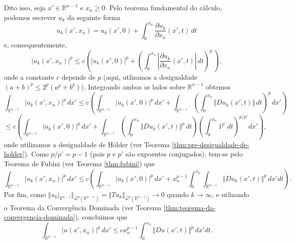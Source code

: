 \documentclass[a4paper, 11pt]{book}
\theoremstyle{definition}
\newcommand{\bR}{\mathbb{R}}
\newcommand{\cL}{\mathcal{L}}
\begin{document}
\begin{prf}
    Dito isso, seja $x' \in \bR^{n-1}$ e $x_n \geqslant 0$.
    Pelo teorema fundamental do cálculo, podemos escrever $u_k$ da seguinte forma
    \[
        u_k(x'\!,x_n) = u_k(x'\!,0) + \int_0^{x_n} \dfrac{\partial u_k}{\partial x_n} (x'\!,t) \,dt
    \]
    e, consequentemente,
    \[
        |u_k(x'\!,x_n)|^p \leqslant c \left(  |u_k(x'\!,0)|^p + \left(  \int_0^{x_n} \left|\dfrac{\partial u_k}{\partial x_n} (x'\!,t)\right| \,dt\right)^{\!p\,} \right),
    \]
    onde a constante $c$ depende de $p$ (aqui, utlizamos a desigualdade $(a + b)^p \leqslant 2^p (a^p + b^p)$). Integrando ambos os lados sobre $\bR^{n-1}$ obtemos
    \[
        \int_{\bR^{n-1}} |u_k(x',x_n)|^p \,dx' \leqslant c \left( \int_{\bR^{n-1}} |u_k(x',0)|^p \,dx' + \int_{\bR^{n-1}} \left(  \int_0^{x_n} \Vert Du_k(x',t) \Vert \,dt\right)^{\!p\,} dx' \right)
    \]
    \[
        \leqslant  c \left( \int_{\bR^{n-1}} |u_k(x',0)|^p \,dx' + \int_{\bR^{n-1}} \left( \int_0^{x_n} \Vert Du_k (x',t) \Vert^p \,dt \right)\left( \int_0^{x_n} 1^{p'} \,dt \right)^{p/p'} dx'\right),
    \]
    onde utilizamos a desigualdade de Hölder (ver Teorema \ref{thm:pre-desigualdade-de-holder}).
    Como $p/p' = p-1$ (pois $p$ e $p'$ são expoentes conjugados), tem-se pelo Teorema de Fubini (ver Teorema \ref{thm:fubini}) que
    \[
        \int_{\bR^{n-1}} |u_k(x',x_n)|^p \,dx' \leqslant c \left( \int_{\bR^{n-1}} |u_k(x',0)|^p \,dx' + x_n^{p-1} \int_{0}^{x_n} \int_{\bR^{n-1}} \Vert Du_k (x',t) \Vert^p  \,dx'dt \right).
    \]
    Por fim, como $\Vert u_k |_{\bR^{n-1}} \Vert_{\cL^p(\bR^{n-1})} = \Vert Tu_k \Vert_{\cL^p(\bR^{n-1})} \to 0$ quando $k \to \infty$, e utlizando o Teorema da Convergência Dominada (ver Teorema \ref{thm:teorema-da-convergencia-dominada}), concluimos que
    \begin{equation} \label{eq:uuuuu}
        \int_{\bR^{n-1}} |u(x',x_n)|^p \,dx' \leqslant  c x_n^{p-1}\int_0^{x_n} \Vert Du(x',t) \Vert^p \,dx'dt.
    \end{equation}
    
    \begin{figure}
        \centering
\end{figure}
\end{prf}
\end{document}
